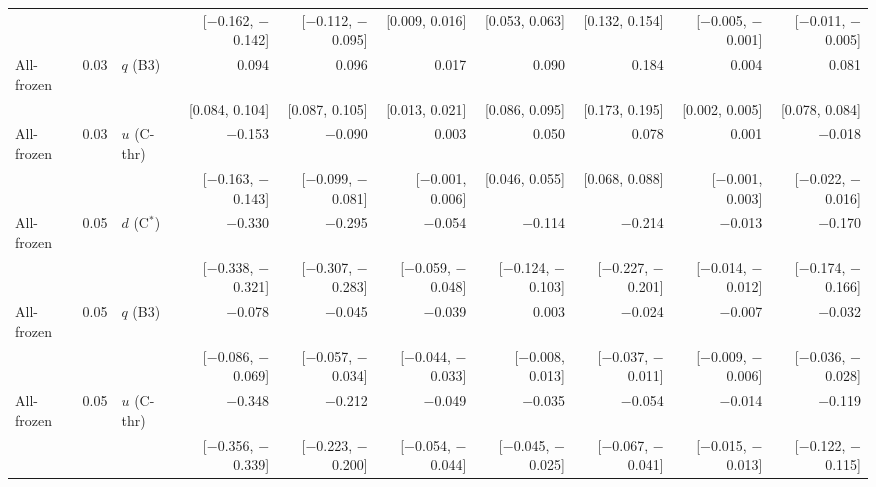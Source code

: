 \begin{tabular}{lllrrrrrrr}
 &  &  & {\scriptsize [$-$0.162, $-$0.142]} & {\scriptsize [$-$0.112, $-$0.095]} & {\scriptsize [0.009, 0.016]} & {\scriptsize [0.053, 0.063]} & {\scriptsize [0.132, 0.154]} & {\scriptsize [$-$0.005, $-$0.001]} & {\scriptsize [$-$0.011, $-$0.005]} \\
All-frozen & 0.03 & $q$ (B3) & 0.094 & 0.096 & 0.017 & 0.090 & 0.184 & 0.004 & 0.081 \\
 &  &  & {\scriptsize [0.084, 0.104]} & {\scriptsize [0.087, 0.105]} & {\scriptsize [0.013, 0.021]} & {\scriptsize [0.086, 0.095]} & {\scriptsize [0.173, 0.195]} & {\scriptsize [0.002, 0.005]} & {\scriptsize [0.078, 0.084]} \\
All-frozen & 0.03 & $u$ (C-thr) & $-$0.153 & $-$0.090 & 0.003 & 0.050 & 0.078 & 0.001 & $-$0.018 \\
 &  &  & {\scriptsize [$-$0.163, $-$0.143]} & {\scriptsize [$-$0.099, $-$0.081]} & {\scriptsize [$-$0.001, 0.006]} & {\scriptsize [0.046, 0.055]} & {\scriptsize [0.068, 0.088]} & {\scriptsize [$-$0.001, 0.003]} & {\scriptsize [$-$0.022, $-$0.016]} \\
All-frozen & 0.05 & $d$ (C$^*$) & $-$0.330 & $-$0.295 & $-$0.054 & $-$0.114 & $-$0.214 & $-$0.013 & $-$0.170 \\
 &  &  & {\scriptsize [$-$0.338, $-$0.321]} & {\scriptsize [$-$0.307, $-$0.283]} & {\scriptsize [$-$0.059, $-$0.048]} & {\scriptsize [$-$0.124, $-$0.103]} & {\scriptsize [$-$0.227, $-$0.201]} & {\scriptsize [$-$0.014, $-$0.012]} & {\scriptsize [$-$0.174, $-$0.166]} \\
All-frozen & 0.05 & $q$ (B3) & $-$0.078 & $-$0.045 & $-$0.039 & 0.003 & $-$0.024 & $-$0.007 & $-$0.032 \\
 &  &  & {\scriptsize [$-$0.086, $-$0.069]} & {\scriptsize [$-$0.057, $-$0.034]} & {\scriptsize [$-$0.044, $-$0.033]} & {\scriptsize [$-$0.008, 0.013]} & {\scriptsize [$-$0.037, $-$0.011]} & {\scriptsize [$-$0.009, $-$0.006]} & {\scriptsize [$-$0.036, $-$0.028]} \\
All-frozen & 0.05 & $u$ (C-thr) & $-$0.348 & $-$0.212 & $-$0.049 & $-$0.035 & $-$0.054 & $-$0.014 & $-$0.119 \\
 &  &  & {\scriptsize [$-$0.356, $-$0.339]} & {\scriptsize [$-$0.223, $-$0.200]} & {\scriptsize [$-$0.054, $-$0.044]} & {\scriptsize [$-$0.045, $-$0.025]} & {\scriptsize [$-$0.067, $-$0.041]} & {\scriptsize [$-$0.015, $-$0.013]} & {\scriptsize [$-$0.122, $-$0.115]} \\
\bottomrule
\end{tabular}
